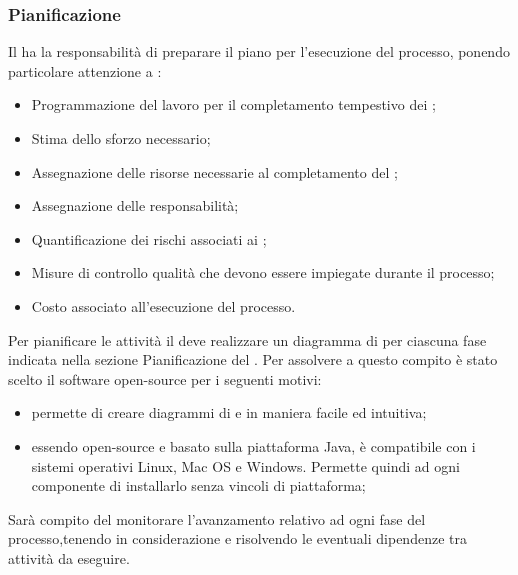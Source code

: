 \documentclass[12pt,a4paper]{article}
\begin{document}
\subsubsection{Pianificazione}\label{Pianificazione} %
Il \PM{} ha la responsabilità di preparare il piano per l'esecuzione del processo, ponendo particolare attenzione a :
\begin{itemize}
  \item Programmazione del lavoro per il completamento tempestivo dei ;
  \item Stima dello sforzo necessario;
  \item Assegnazione delle risorse necessarie al completamento del ;
  \item Assegnazione delle responsabilità;
  \item Quantificazione dei rischi associati ai ;
  \item Misure di controllo qualità che devono essere impiegate durante il processo;
  \item Costo associato all'esecuzione del processo.
\end{itemize}

Per pianificare le attività il \PM{} deve realizzare un diagramma di  per ciascuna fase indicata nella sezione Pianificazione del \PdP{}.
Per assolvere a questo compito è stato scelto il software open-source  per i seguenti motivi:
\begin{itemize}
  \item permette di creare diagrammi di  e  in maniera facile ed intuitiva;
  \item essendo open-source e basato sulla piattaforma Java, è compatibile con i sistemi operativi Linux, Mac OS e Windows. Permette quindi ad ogni componente di installarlo senza vincoli di piattaforma;
\end{itemize}

Sarà compito del \PM{} monitorare l'avanzamento relativo ad ogni fase del processo,tenendo in considerazione e risolvendo le eventuali dipendenze tra attività da eseguire.
\end{document}
